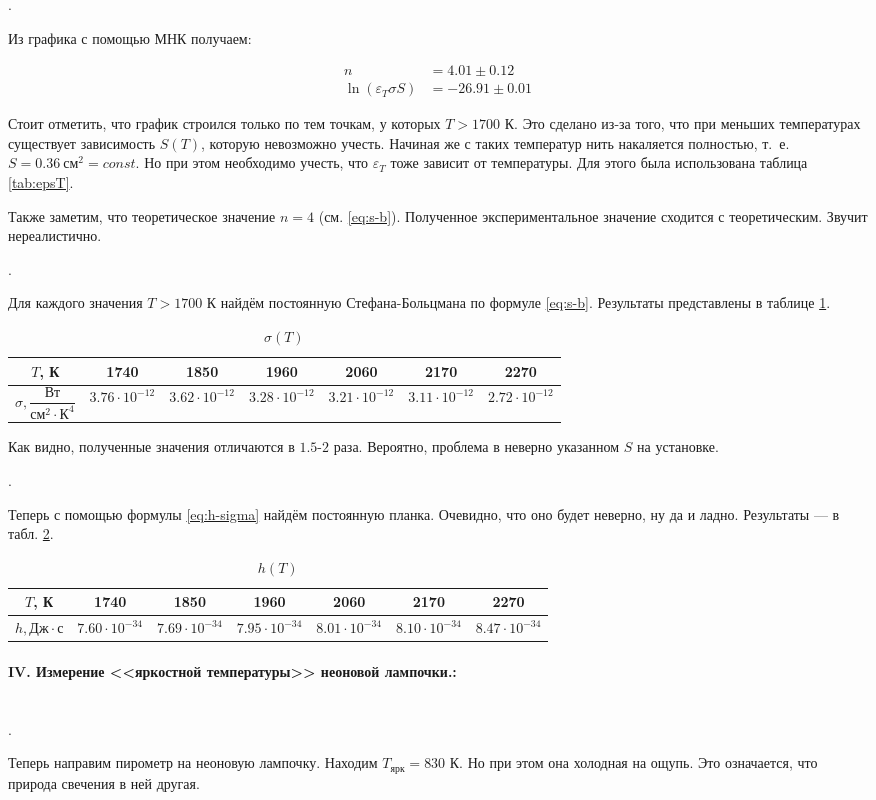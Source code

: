 \documentclass[a4paper, 12pt]{article}
\newcommand{\eps}{\varepsilon}
\newcommand{\parag}[1]{\paragraph*{#1:}}
\newcounter{Points}
\newcommand{\point}{\arabic{Points}. \addtocounter{Points}{1}}
\begin{document}
\point Из графика с помощью МНК получаем:

\begin{align*}
    n &= 4.01 \pm 0.12 \\
    \ln (\eps_T \sigma S) &= -26.91 \pm 0.01
\end{align*}

Стоит отметить, что график строился только по тем точкам, у которых $T > 1700$ К. Это сделано из-за того, что при меньших температурах существует зависимость $S(T)$, которую невозможно учесть. Начиная же с таких температур нить накаляется полностью, т.~е. $S = 0.36~см^2 = const$. Но при этом необходимо учесть, что $\eps_T$ тоже зависит от температуры. Для этого была использована таблица \ref{tab:epsT}.

Также заметим, что теоретическое значение $n = 4$ (см. \eqref{eq:s-b}). Полученное экспериментальное значение сходится с теоретическим. Звучит нереалистично.

\point Для каждого значения $T > 1700$ К найдём постоянную Стефана-Больцмана по формуле \ref{eq:s-b}. Результаты представлены в таблице \ref{tab:sigma}.

\begin{table}[!h]
    \centering
    \begin{tabular}{|c|c|c|c|c|c|c|}
        \hline
        $T$, К   &   1740 &  1850 &  1960 &  2060 & 2170 & 2270 \\ \hline
        $\sigma, \dfrac{Вт}{см^2 \cdot К^4}$ & $3.76 \cdot 10^{-12}$ & $3.62 \cdot 10^{-12}$ & $3.28 \cdot 10^{-12}$ & $3.21 \cdot 10^{-12}$ & $3.11 \cdot 10^{-12}$ & $2.72 \cdot 10^{-12}$ \\ \hline
    \end{tabular}
    \caption {$\sigma (T)$}
    \label{tab:sigma}
\end{table}

Как видно, полученные значения отличаются в $1.5$-$2$ раза. Вероятно, проблема в неверно указанном $S$ на установке.

\point Теперь с помощью формулы \eqref{eq:h-sigma} найдём постоянную планка. Очевидно, что оно будет неверно, ну да и ладно. Результаты --- в табл. \ref{tab:h}.

\begin{table}[!h]
    \centering
    \begin{tabular}{|c|c|c|c|c|c|c|}
        \hline
        $T$, К   &   1740 &  1850 &  1960 &  2060 & 2170 & 2270 \\ \hline
        $h, Дж \cdot с$ & $7.60 \cdot 10^{-34}$ & $7.69 \cdot 10^{-34}$ & $7.95 \cdot 10^{-34}$ & $8.01 \cdot 10^{-34}$ & $8.10 \cdot 10^{-34}$ & $8.47 \cdot 10^{-34}$ \\ \hline
    \end{tabular}
    \caption {$h (T)$}
    \label{tab:h}
\end{table}

\newpage

\parag {IV. Измерение <<яркостной температуры>> неоновой лампочки.} ~\\

\point Теперь направим пирометр на неоновую лампочку. Находим $T_{ярк} = 830$ К. Но при этом она холодная на ощупь. Это означается, что природа свечения в ней другая.


\end{document}
